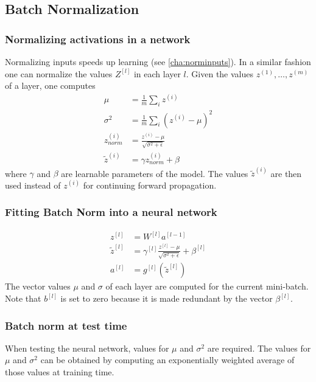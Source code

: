 \documentclass{article}
\begin{document}
\subsection{Batch Normalization}
\subsubsection{Normalizing activations in a network}
Normalizing inputs speeds up learning (see \cref{cha:norminputs}).
In a similar fashion one can normalize the values $Z^{[l]}$ in each layer $l$.
Given the values $z^{(1)},\ldots,z^{(m)}$ of a layer, one computes
\begin{equation}
  \begin{split}
    \mu&=\frac{1}{m}\sum_i z^{(i)}\\
    \sigma^2&=\frac{1}{m}\sum_i (z^{(i)}-\mu)^2\\
    z^{(i)}_{norm}&=\frac{z^{(i)}-\mu}{\sqrt{\sigma^2+\epsilon}}\\
    \tilde{z}^{(i)}&=\gamma z^{(i)}_{norm}+\beta
  \end{split}
\end{equation}
where $\gamma$ and $\beta$ are learnable parameters of the model.
The values $\tilde{z}^{(i)}$ are then used instead of $z^{(i)}$ for continuing forward propagation.

\subsubsection{Fitting Batch Norm into a neural network}
\begin{equation}
  \begin{split}
    z^{[l]}&=W^{[l]}a^{[l-1]}\\
    \tilde{z}^{[l]}&=\gamma^{[l]}\frac{z^{[l]}-\mu}{\sqrt{\sigma^2+\epsilon}}+\beta^{[l]}\\
    a^{[l]}&=g^{[l]}(\tilde{z}^{[l]})
  \end{split}
\end{equation}
The vector values $\mu$ and $\sigma$ of each layer are computed for the current mini-batch.
Note that $b^{[l]}$ is set to zero because it is made redundant by the vector $\beta^{[l]}$.

\subsubsection{Batch norm at test time}
When testing the neural network, values for $\mu$ and $\sigma^2$ are required.
The values for $\mu$ and $\sigma^2$ can be obtained by computing an exponentially weighted average
of those values at training time.
\end{document}
